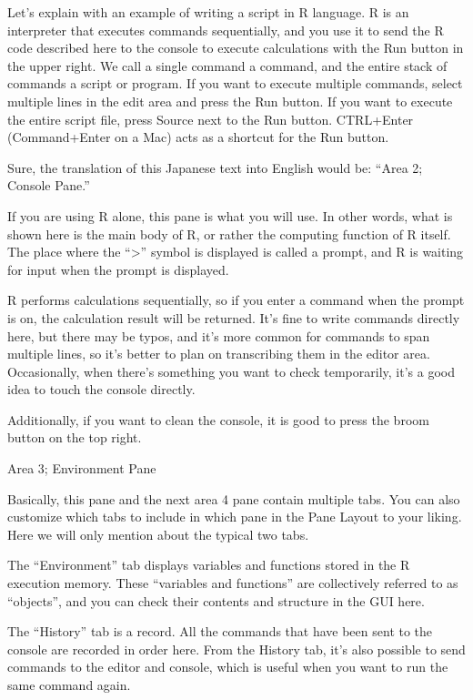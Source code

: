 \documentclass[
  a4paper,
]{book}
\begin{document}
Let's explain with an example of writing a script in R language. R is an
interpreter that executes commands sequentially, and you use it to send
the R code described here to the console to execute calculations with
the Run button in the upper right. We call a single command a command,
and the entire stack of commands a script or program. If you want to
execute multiple commands, select multiple lines in the edit area and
press the Run button. If you want to execute the entire script file,
press Source next to the Run button. CTRL+Enter (Command+Enter on a Mac)
acts as a shortcut for the Run button.

Sure, the translation of this Japanese text into English would be:
``Area 2; Console Pane.''

If you are using R alone, this pane is what you will use. In other
words, what is shown here is the main body of R, or rather the computing
function of R itself. The place where the ``\textgreater{}'' symbol is
displayed is called a prompt, and R is waiting for input when the prompt
is displayed.

R performs calculations sequentially, so if you enter a command when the
prompt is on, the calculation result will be returned. It's fine to
write commands directly here, but there may be typos, and it's more
common for commands to span multiple lines, so it's better to plan on
transcribing them in the editor area. Occasionally, when there's
something you want to check temporarily, it's a good idea to touch the
console directly.

Additionally, if you want to clean the console, it is good to press the
broom button on the top right.

Area 3; Environment Pane

Basically, this pane and the next area 4 pane contain multiple tabs. You
can also customize which tabs to include in which pane in the Pane
Layout to your liking. Here we will only mention about the typical two
tabs.

The ``Environment'' tab displays variables and functions stored in the R
execution memory. These ``variables and functions'' are collectively
referred to as ``objects'', and you can check their contents and
structure in the GUI here.

The ``History'' tab is a record. All the commands that have been sent to
the console are recorded in order here. From the History tab, it's also
possible to send commands to the editor and console, which is useful
when you want to run the same command again.
\end{document}
